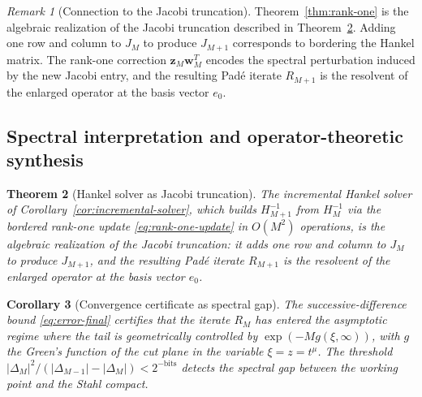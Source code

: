 \documentclass[11pt]{article}
\newtheorem{theorem}{Theorem}[section]
\newtheorem{corollary}[theorem]{Corollary}
\theoremstyle{definition}
\theoremstyle{remark}
\newtheorem{remark}[theorem]{Remark}
\begin{document}
\begin{remark}[Connection to the Jacobi truncation]
\label{rem:jacobi-update}
Theorem~\ref{thm:rank-one} is the algebraic realization of the Jacobi truncation described in Theorem~\ref{thm:hankel-jacobi}. Adding one row and column to $J_{M}$ to produce $J_{M+1}$ corresponds to bordering the Hankel matrix. The rank-one correction $\mathbf{z}_{M}\mathbf{w}_{M}^{T}$ encodes the spectral perturbation induced by the new Jacobi entry, and the resulting Pad\'e iterate $R_{M+1}$ is the resolvent of the enlarged operator at the basis vector $e_{0}$.
\end{remark}

\subsection{Spectral interpretation and operator-theoretic synthesis}
\label{sec:heston-spectral}

\begin{theorem}[Hankel solver as Jacobi truncation]
\label{thm:hankel-jacobi}
The incremental Hankel solver of Corollary~\ref{cor:incremental-solver}, which builds $H_{M+1}^{-1}$ from $H_{M}^{-1}$ via the bordered rank-one update \eqref{eq:rank-one-update} in $O(M^{2})$ operations, is the algebraic realization of the Jacobi truncation: it adds one row and column to $J_{M}$ to produce $J_{M+1}$, and the resulting Pad\'e iterate $R_{M+1}$ is the resolvent of the enlarged operator at the basis vector $e_{0}$.
\end{theorem}

\begin{corollary}[Convergence certificate as spectral gap]
\label{cor:spectral-gap}
The successive-difference bound \eqref{eq:error-final} certifies that the iterate $R_{M}$ has entered the asymptotic regime where the tail is geometrically controlled by $\exp(-Mg(\xi,\infty))$, with $g$ the Green's function of the cut plane in the variable $\xi=z=t^{\mu}$. The threshold $|\Delta_{M}|^{2}/(|\Delta_{M-1}|-|\Delta_{M}|)<2^{-\mathrm{bits}}$ detects the spectral gap between the working point and the Stahl compact.
\end{corollary}
\end{document}
